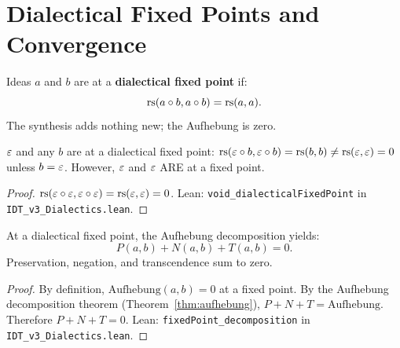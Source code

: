 \section{Dialectical Fixed Points and Convergence}

\begin{definition}
\label{def:dialectical-fixed-point}
Ideas $a$ and $b$ are at a \textbf{dialectical fixed point} if:
\[
\mathrm{rs}(a \circ b, a \circ b) = \mathrm{rs}(a, a).
\]
The synthesis adds nothing new; the Aufhebung is zero.
\end{definition}

\begin{theorem}
\label{thm:void-fixed}
$\varepsilon$ and any $b$ are at a dialectical fixed point: $\mathrm{rs}(\varepsilon \circ b,
\varepsilon \circ b) = \mathrm{rs}(b, b) \neq \mathrm{rs}(\varepsilon, \varepsilon) = 0$ unless $b = \varepsilon$.
However, $\varepsilon$ and $\varepsilon$ ARE at a fixed point.
\end{theorem}

\begin{proof}
$\mathrm{rs}(\varepsilon \circ \varepsilon, \varepsilon \circ \varepsilon) = \mathrm{rs}(\varepsilon, \varepsilon) = 0$.
Lean: \texttt{void\_dialecticalFixedPoint} in \texttt{IDT\_v3\_Dialectics.lean}.
\end{proof}

\begin{theorem}
\label{thm:fixed-point-decomp}
At a dialectical fixed point, the Aufhebung decomposition yields:
\[
P(a, b) + N(a, b) + T(a, b) = 0.
\]
Preservation, negation, and transcendence sum to zero.
\end{theorem}

\begin{proof}
By definition, $\mathrm{Aufhebung}(a, b) = 0$ at a fixed point. By the
Aufhebung decomposition theorem (Theorem~\ref{thm:aufhebung}),
$P + N + T = \mathrm{Aufhebung}$. Therefore $P + N + T = 0$.
Lean: \texttt{fixedPoint\_decomposition} in \texttt{IDT\_v3\_Dialectics.lean}.
\end{proof}

